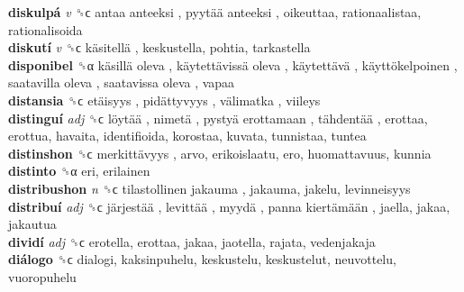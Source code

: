\textbf{diskulpá} \emph{v}  ␝ϲ   antaa anteeksi ,  pyytää anteeksi , oikeuttaa, rationaalistaa, rationalisoida  \\
\textbf{diskutí} \emph{v}  ␝ϲ   käsitellä , keskustella, pohtia, tarkastella  \\
\textbf{disponibel} ␝α   käsillä oleva ,  käytettävissä oleva ,  käytettävä ,  käyttökelpoinen ,  saatavilla oleva ,  saatavissa oleva , vapaa  \\
\textbf{distansia} ␝ϲ   etäisyys ,  pidättyvyys ,  välimatka , viileys  \\
\textbf{distinguí} \emph{adj}  ␝ϲ   löytää ,  nimetä ,  pystyä erottamaan ,  tähdentää , erottaa, erottua, havaita, identifioida, korostaa, kuvata, tunnistaa, tuntea  \\
\textbf{distinshon} ␝ϲ   merkittävyys , arvo, erikoislaatu, ero, huomattavuus, kunnia  \\
\textbf{distinto} ␝α  eri, erilainen  \\
\textbf{distribushon} \emph{n}  ␝ϲ   tilastollinen jakauma , jakauma, jakelu, levinneisyys  \\
\textbf{distribuí} \emph{adj}  ␝ϲ   järjestää ,  levittää ,  myydä ,  panna kiertämään , jaella, jakaa, jakautua  \\
\textbf{dividí} \emph{adj}  ␝ϲ  erotella, erottaa, jakaa, jaotella, rajata, vedenjakaja  \\
\textbf{diálogo} ␝ϲ  dialogi, kaksinpuhelu, keskustelu, keskustelut, neuvottelu, vuoropuhelu  \\
